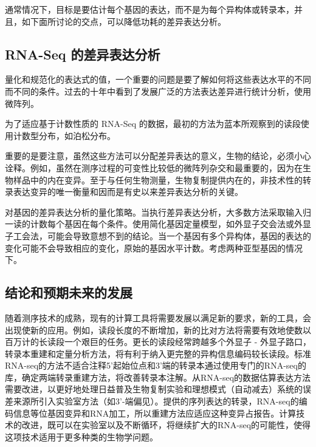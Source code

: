 通常情况下，目标是要估计每个基因的表达，而不是为每个异构体或转录本，并且，如下面所讨论的交点，可以降低功耗的差异表达分析。

\subsection{RNA-Seq 的差异表达分析}

量化和规范化的表达式的值，一个重要的问题是要了解如何将这些表达水平的不同而不同的条件。过去的十年中看到了发展广泛的方法表达差异进行统计分析，使用微阵列。

为了适应基于计数性质的 RNA-Seq 的数据，最初的方法为蓝本所观察到的读段使用计数型分布，如泊松分布。

重要的是要注意，虽然这些方法可以分配差异表达的意义，生物的结论，必须小心诠释。例如，虽然在测序过程的可变性比较低的微阵列杂交和最重要的，因为在生物样品中的内在变异。至于与任何生物测量，生物复制提供内在的，非技术性的转录表达变异的唯一衡量和因而是有史以来差异表达分析的关键。

对基因的差异表达分析的量化策略。当执行差异表达分析，大多数方法采取输入归一读的计数每个基因在每个条件。使用简化基因定量模型，如外显子交会法或外显子工会法，可能会导致意想不到的结论。当一个基因有多个异构体，基因的表达的变化可能不会导致相应的变化，原始的基因水平计数。考虑两种亚型基因的情况下。

\subsection{结论和预期未来的发展}

随着测序技术的成熟，现有的计算工具将需要发展以满足新的要求，新的工具，会出现使新的应用。例如，读段长度的不断增加，新的比对方法将需要有效地使数以百万计的长读段一个艰巨的任务。更长的读段经常跨越多个外显子 - 外显子路口，转录本重建和定量分析方法，将有利于纳入更完整的异构信息编码较长读段。标准RNA-seq的方法不适合注释5'起始位点和3'端的转录本通过使用专门的RNA-seq的库，确定两端转录重建方法，将改善转录本注解。从RNA-seq的数据估算表达方法需要改进，以更好地处理日益普及生物复制实验和理想模式（自动减去）系统的误差来源所引入实验室方法（如3'-端偏见）。提供的序列表达的转录，RNA-seq的编码信息等位​​基因变异和RNA加工，所以重建方法应适应这种变异占报告。计算技术的改进，既可以在实验室以及不断循环，将继续扩大的RNA-seq的可能性，使得这项技术适用于更多种类的生物学问题。





